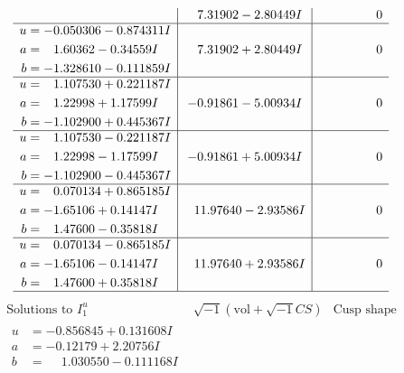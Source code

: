 \documentclass[1p]{elsarticle_modified}
\theoremstyle{definition}
\newcommand{\I}{\sqrt{-1}}
\begin{document}
$$\begin{array}{c|c|c}
 & \phantom{-}7.31902 - 2.80449 I & \phantom{-0.000000 } 0 \\ \hline\begin{aligned}
u &= -0.050306 - 0.874311 I \\
a &= \phantom{-}1.60362 - 0.34559 I \\
b &= -1.328610 - 0.111859 I\end{aligned}
 & \phantom{-}7.31902 + 2.80449 I & \phantom{-0.000000 } 0 \\ \hline\begin{aligned}
u &= \phantom{-}1.107530 + 0.221187 I \\
a &= \phantom{-}1.22998 + 1.17599 I \\
b &= -1.102900 + 0.445367 I\end{aligned}
 & -0.91861 - 5.00934 I & \phantom{-0.000000 } 0 \\ \hline\begin{aligned}
u &= \phantom{-}1.107530 - 0.221187 I \\
a &= \phantom{-}1.22998 - 1.17599 I \\
b &= -1.102900 - 0.445367 I\end{aligned}
 & -0.91861 + 5.00934 I & \phantom{-0.000000 } 0 \\ \hline\begin{aligned}
u &= \phantom{-}0.070134 + 0.865185 I \\
a &= -1.65106 + 0.14147 I \\
b &= \phantom{-}1.47600 - 0.35818 I\end{aligned}
 & \phantom{-}11.97640 - 2.93586 I & \phantom{-0.000000 } 0 \\ \hline\begin{aligned}
u &= \phantom{-}0.070134 - 0.865185 I \\
a &= -1.65106 - 0.14147 I \\
b &= \phantom{-}1.47600 + 0.35818 I\end{aligned}
 & \phantom{-}11.97640 + 2.93586 I & \phantom{-0.000000 } 0\\
 \hline 
 \end{array}$$\newpage$$\begin{array}{c|c|c}  
\text{Solutions to }I^u_{1}& \I (\text{vol} + \sqrt{-1}CS) & \text{Cusp shape}\\
 \hline 
\begin{aligned}
u &= -0.856845 + 0.131608 I \\
a &= -0.12179 + 2.20756 I \\
b &= \phantom{-}1.030550 - 0.111168 I\end{aligned}

\end{array}$$
\end{document}

